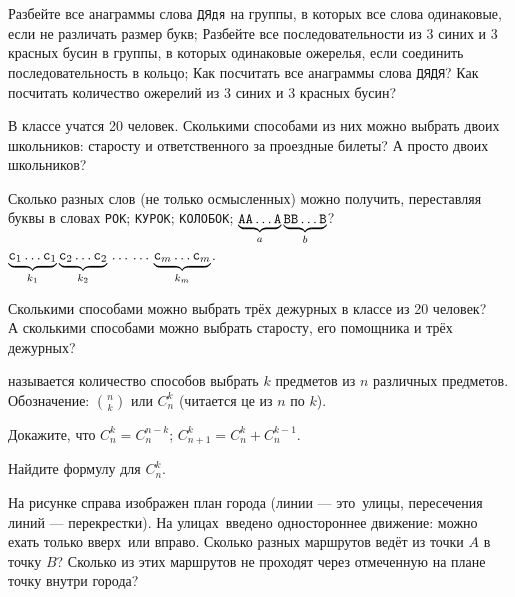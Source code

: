 \documentclass[12pt,a4paper]{article}
\begin{document}


 Разбейте все анаграммы слова {\tt ДЯдя} на группы, в которых все слова одинаковые, если не различать размер букв;
 Разбейте все последовательности из 3 синих и 3 красных бусин в группы, в которых одинаковые ожерелья, если соединить последовательность в кольцо;
 Как посчитать все анаграммы слова {\tt ДЯДЯ}?
 Как посчитать количество ожерелий из 3 синих и 3 красных бусин?


 В классе учатся 20 человек. Сколькими способами из них можно
выбрать двоих школьников: старосту и ответственного за проездные билеты?
А просто двоих школьников?

Сколько разных слов (не только осмысленных) можно получить,
переставляя буквы в словах
{\tt РОК};
{\tt КУРОК};
{\tt КОЛОБОК};
$\underbrace{{\tt A}{\tt A}\dots{\tt A}}_a
\underbrace{{\tt B}{\tt B}\dots{\tt B}}_b$?
$\underbrace{{\tt c}_1\dots{\tt c}_1}_{k_1}
\underbrace{{\tt c}_2\dots{\tt c}_2}_{k_2}
\,\dots\,\dots\,
\underbrace{{\tt c}_m\dots{\tt c}_m}_{k_m}$.

 Сколькими способами можно выбрать трёх дежурных в классе
из 20 человек?\\
 А сколькими способами можно выбрать старосту, его помощника
и трёх дежурных?

  называется количество
способов выбрать $k$ предметов из $n$ различных предметов.
Обозначение: $n\choose k$
или $C_n^k$ (читается  це из $n$ по $k$).

Докажите, что
$C_n^k=C_n^{n-k}$;
$C_{n+1}^k=C_n^k+C_n^{k-1}$.

Найдите формулу для $C_n^k$.

На рисунке справа изображен план города
(линии --- это~ули\-цы,  пересечения линий --- перекрестки).
На улицах~\hbox{введено} одностороннее движение: мож\-но
ехать только  вверх\ или  впра\-во. Сколько разных
маршрутов ведёт из точ\-ки $A$ в точ\-ку $B$?
Сколько из этих маршрутов не проходят через отмеченную на плане
точку внутри города?
\end{document}
